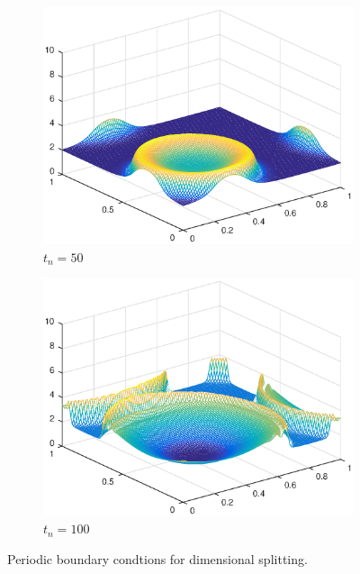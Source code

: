\begin{figure}[h!]
\begin{subfigure}[t]{0.48\textwidth}
        \centering
        \includegraphics[width=\textwidth]{images/sol_ds_0050.eps}
        \caption{$t_{n}=50$}
        \label{fig:50}
    \end{subfigure}
    \begin{subfigure}[t]{0.48\textwidth}
        \centering
        \includegraphics[width=\textwidth]{images/sol_ds_0100.eps}
        \caption{$t_{n}=100$}
        \label{fig:100}
    \end{subfigure}
    \caption{Periodic boundary condtions for dimensional splitting.}
    \label{fig:2DSolutions_ds}
\end{figure}

